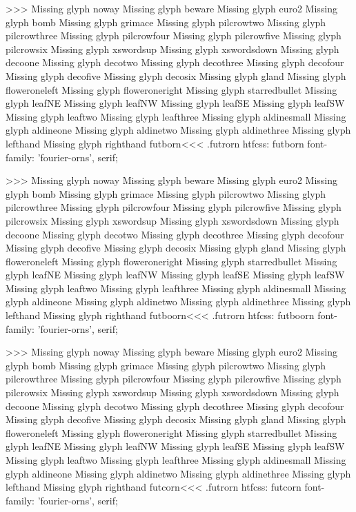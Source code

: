{>>>
Missing glyph	noway
Missing glyph	beware
Missing glyph	euro2
Missing glyph	bomb
Missing glyph	grimace
Missing glyph	pilcrowtwo
Missing glyph	pilcrowthree
Missing glyph	pilcrowfour
Missing glyph	pilcrowfive
Missing glyph	pilcrowsix
Missing glyph	xswordsup
Missing glyph	xswordsdown
Missing glyph	decoone
Missing glyph	decotwo
Missing glyph	decothree
Missing glyph	decofour
Missing glyph	decofive
Missing glyph	decosix
Missing glyph	gland
Missing glyph	floweroneleft
Missing glyph	floweroneright
Missing glyph	starredbullet
Missing glyph	leafNE
Missing glyph	leafNW
Missing glyph	leafSE
Missing glyph	leafSW
Missing glyph	leaftwo
Missing glyph	leafthree
Missing glyph	aldinesmall
Missing glyph	aldineone
Missing glyph	aldinetwo
Missing glyph	aldinethree
Missing glyph	lefthand
Missing glyph	righthand
\<futborn\><<<
.futrorn
htfcss:  futborn  font-family: 'fourier-orns', serif;

>>>
Missing glyph	noway
Missing glyph	beware
Missing glyph	euro2
Missing glyph	bomb
Missing glyph	grimace
Missing glyph	pilcrowtwo
Missing glyph	pilcrowthree
Missing glyph	pilcrowfour
Missing glyph	pilcrowfive
Missing glyph	pilcrowsix
Missing glyph	xswordsup
Missing glyph	xswordsdown
Missing glyph	decoone
Missing glyph	decotwo
Missing glyph	decothree
Missing glyph	decofour
Missing glyph	decofive
Missing glyph	decosix
Missing glyph	gland
Missing glyph	floweroneleft
Missing glyph	floweroneright
Missing glyph	starredbullet
Missing glyph	leafNE
Missing glyph	leafNW
Missing glyph	leafSE
Missing glyph	leafSW
Missing glyph	leaftwo
Missing glyph	leafthree
Missing glyph	aldinesmall
Missing glyph	aldineone
Missing glyph	aldinetwo
Missing glyph	aldinethree
Missing glyph	lefthand
Missing glyph	righthand
\<futboorn\><<<
.futrorn
htfcss:  futboorn  font-family: 'fourier-orns', serif;

>>>
Missing glyph	noway
Missing glyph	beware
Missing glyph	euro2
Missing glyph	bomb
Missing glyph	grimace
Missing glyph	pilcrowtwo
Missing glyph	pilcrowthree
Missing glyph	pilcrowfour
Missing glyph	pilcrowfive
Missing glyph	pilcrowsix
Missing glyph	xswordsup
Missing glyph	xswordsdown
Missing glyph	decoone
Missing glyph	decotwo
Missing glyph	decothree
Missing glyph	decofour
Missing glyph	decofive
Missing glyph	decosix
Missing glyph	gland
Missing glyph	floweroneleft
Missing glyph	floweroneright
Missing glyph	starredbullet
Missing glyph	leafNE
Missing glyph	leafNW
Missing glyph	leafSE
Missing glyph	leafSW
Missing glyph	leaftwo
Missing glyph	leafthree
Missing glyph	aldinesmall
Missing glyph	aldineone
Missing glyph	aldinetwo
Missing glyph	aldinethree
Missing glyph	lefthand
Missing glyph	righthand
\<futcorn\><<<
.futrorn
htfcss:  futcorn  font-family: 'fourier-orns', serif;

}
